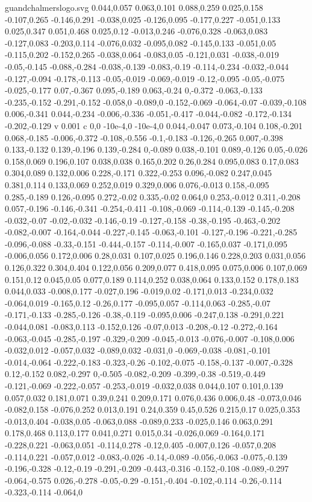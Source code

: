 \begin{filecontents}[noheader]{guandchalmerslogo.svg}
0.044,0.057 0.063,0.101 0.088,0.259 0.025,0.158 -0.107,0.265 -0.146,0.291 -0.038,0.025 -0.126,0.095 -0.177,0.227 -0.051,0.133 0.025,0.347 0.051,0.468 0.025,0.12 -0.013,0.246 -0.076,0.328 -0.063,0.083 -0.127,0.083 -0.203,0.114 -0.076,0.032 -0.095,0.082 -0.145,0.133 -0.051,0.05 -0.115,0.202 -0.152,0.265 -0.038,0.064 -0.083,0.05 -0.121,0.031 -0.038,-0.019 -0.05,-0.145 -0.088,-0.284 -0.038,-0.139 -0.083,-0.19 -0.114,-0.234 -0.032,-0.044 -0.127,-0.094 -0.178,-0.113 -0.05,-0.019 -0.069,-0.019 -0.12,-0.095 -0.05,-0.075 -0.025,-0.177 0.07,-0.367 0.095,-0.189 0.063,-0.24 0,-0.372 -0.063,-0.133 -0.235,-0.152 -0.291,-0.152 -0.058,0 -0.089,0 -0.152,-0.069 -0.064,-0.07 -0.039,-0.108 0.006,-0.341 0.044,-0.234 -0.006,-0.336 -0.051,-0.417 -0.044,-0.082 -0.172,-0.134 -0.202,-0.129 v 0.001 c 0,0 -10e-4,0 -10e-4,0 0.044,-0.047 0.073,-0.104 0.108,-0.201 0.068,-0.185 -0.006,-0.372 -0.108,-0.556 -0.1,-0.183 -0.126,-0.265 0.007,-0.398 0.133,-0.132 0.139,-0.196 0.139,-0.284 0,-0.089 0.038,-0.101 0.089,-0.126 0.05,-0.026 0.158,0.069 0.196,0.107 0.038,0.038 0.165,0.202 0.26,0.284 0.095,0.083 0.17,0.083 0.304,0.089 0.132,0.006 0.228,-0.171 0.322,-0.253 0.096,-0.082 0.247,0.045 0.381,0.114 0.133,0.069 0.252,0.019 0.329,0.006 0.076,-0.013 0.158,-0.095 0.285,-0.189 0.126,-0.095 0.272,-0.02 0.335,-0.02 0.064,0 0.253,-0.012 0.311,-0.208 0.057,-0.196 -0.146,-0.341 -0.254,-0.411 -0.108,-0.069 -0.114,-0.139 -0.145,-0.208 -0.032,-0.07 -0.02,-0.032 -0.146,-0.19 -0.127,-0.158 -0.38,-0.195 -0.463,-0.202 -0.082,-0.007 -0.164,-0.044 -0.227,-0.145 -0.063,-0.101 -0.127,-0.196 -0.221,-0.285 -0.096,-0.088 -0.33,-0.151 -0.444,-0.157 -0.114,-0.007 -0.165,0.037 -0.171,0.095 -0.006,0.056 0.172,0.006 0.28,0.031 0.107,0.025 0.196,0.146 0.228,0.203 0.031,0.056 0.126,0.322 0.304,0.404 0.122,0.056 0.209,0.077 0.418,0.095 0.075,0.006 0.107,0.069 0.151,0.12 0.045,0.05 0.077,0.189 0.114,0.252 0.038,0.064 0.133,0.152 0.178,0.183 0.044,0.033 -0.008,0.177 -0.027,0.196 -0.019,0.02 -0.171,0.013 -0.234,0.032 -0.064,0.019 -0.165,0.12 -0.26,0.177 -0.095,0.057 -0.114,0.063 -0.285,-0.07 -0.171,-0.133 -0.285,-0.126 -0.38,-0.119 -0.095,0.006 -0.247,0.138 -0.291,0.221 -0.044,0.081 -0.083,0.113 -0.152,0.126 -0.07,0.013 -0.208,-0.12 -0.272,-0.164 -0.063,-0.045 -0.285,-0.197 -0.329,-0.209 -0.045,-0.013 -0.076,-0.007 -0.108,0.006 -0.032,0.012 -0.057,0.032 -0.089,0.032 -0.031,0 -0.069,-0.038 -0.081,-0.101 -0.014,-0.064 -0.222,-0.183 -0.323,-0.26 -0.102,-0.075 -0.158,-0.137 -0.007,-0.328 0.12,-0.152 0.082,-0.297 0,-0.505 -0.082,-0.209 -0.399,-0.38 -0.519,-0.449 -0.121,-0.069 -0.222,-0.057 -0.253,-0.019 -0.032,0.038 0.044,0.107 0.101,0.139 0.057,0.032 0.181,0.071 0.39,0.241 0.209,0.171 0.076,0.436 0.006,0.48 -0.073,0.046 -0.082,0.158 -0.076,0.252 0.013,0.191 0.24,0.359 0.45,0.526 0.215,0.17 0.025,0.353 -0.013,0.404 -0.038,0.05 -0.063,0.088 -0.089,0.233 -0.025,0.146 0.063,0.291 0.178,0.468 0.113,0.177 0.041,0.271 0.015,0.34 -0.026,0.069 -0.164,0.171 -0.228,0.221 -0.063,0.051 -0.114,0.278 -0.12,0.405 -0.007,0.126 -0.057,0.208 -0.114,0.221 -0.057,0.012 -0.083,-0.026 -0.14,-0.089 -0.056,-0.063 -0.075,-0.139 -0.196,-0.328 -0.12,-0.19 -0.291,-0.209 -0.443,-0.316 -0.152,-0.108 -0.089,-0.297 -0.064,-0.575 0.026,-0.278 -0.05,-0.29 -0.151,-0.404 -0.102,-0.114 -0.26,-0.114 -0.323,-0.114 -0.064,0 
\end{filecontents}
